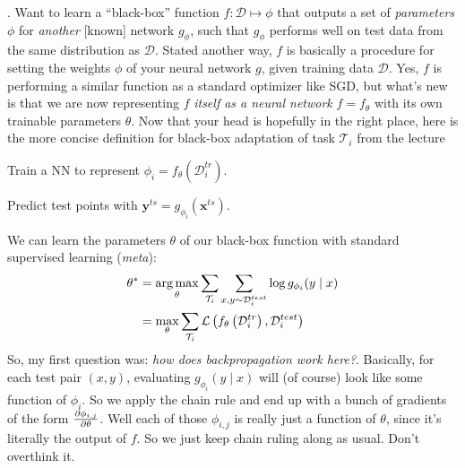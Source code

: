 \documentclass[11pt]{article}
\renewcommand\vec[2][]{\bm{#2}_{#1}}
\begin{document}
\dosecttoc
\tableofcontents




\label{Lectures}


. Want to learn a ``black-box'' function $f : \mathcal D \mapsto \phi$ that outputs a set of \textit{parameters} $\phi$ for \textit{another} [known] network $g_{\phi}$, such that $g_{\phi}$ performs well on test data from the same distribution as $\mathcal D$. Stated another way, $f$ is basically a procedure for setting the weights $\phi$ of your neural network $g$, given training data $\mathcal D$. Yes, $f$ is performing a similar function as a standard optimizer like SGD, but what's new is that we are now representing $f$ \textit{itself as a neural network} $f = f_{\theta}$ with its own trainable parameters $\theta$.  Now that your head is hopefully in the right place, here is the more concise definition for black-box adaptation of task $\mathcal{T}_i$  from the lecture
\begin{compactenum}
	\item Train a NN to represent $\phi_i = f_{\theta}(\mathcal{D}_i^{tr})$. 
	\item Predict test points with $\vec{y}^{ts} = g_{\phi_i}(\vec{x}^{ts})$. 
\end{compactenum}
We can learn the parameters $\theta$ of our black-box function with standard supervised learning (\textit{meta}):
\begin{align}
	\theta^* 
		&= \operatorname*{arg\,max}_{\theta} \sum_{\mathcal{T}_i} \sum_{x,y \sim \mathcal{D}_i^{test}} \log g_{\phi_i} (y \mid x) \\
		&= \max_{\theta}  \sum_{\mathcal{T}_i}  \mathcal{L}\left(  f_{\theta}\left(  \mathcal{D}_i^{tr}  \right)  , \mathcal{D}_i^{test}  \right)
\end{align}
So, my first question was: \textit{how does backpropagation work here?}. Basically, for each test pair $(x, y)$, evaluating $g_{\phi_i}(y \mid x)$ will (of course) look like some function of $\phi_i$. So we apply the chain rule and end up with a bunch of gradients of the form $\frac{\partial \phi_{i,j}}{\partial \theta}$. Well each of those $\phi_{i,j}$ is really just a function of $\theta$, since it's literally the output of $f$. So we just keep chain ruling along as usual. Don't overthink it.
\end{document}
